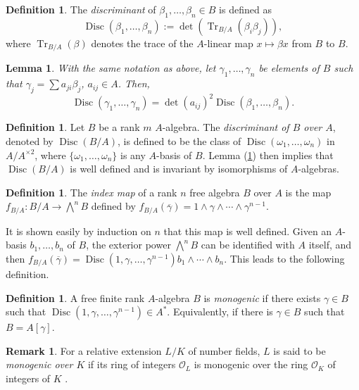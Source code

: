 \documentclass[oneside]{amsart}
\DeclareMathOperator{\disc}{Disc}
\DeclareMathOperator{\tr}{Tr}
\newtheorem{lemma}[X]{Lemma}
\theoremstyle{definition}
\newtheorem{definition}[X]{Definition}
\newtheorem{remark}[X]{Remark}
\begin{document}
\begin{definition}{\cite[pp. 31,32]{milneANT}} The \textit{discriminant} of  $\beta_1, \dots, \beta_n\in B$ is defined as
    $$
    \disc(\beta_1,\dots,\beta_n) := \det(\tr_{B/A}(\beta_i\beta_j)),
    $$
    where $\tr_{B/A}(\beta)$ denotes the trace of  the $A$-linear map 
    $x \mapsto \beta x$ from $B$ to $B$. 
\end{definition}
\begin{lemma}{\cite[Lem. 2.23]{milneANT}}
    \label{lemma: disc of elements}
    With the same notation as above, let $\gamma_1,\dots, \gamma_n$ be elements of $B$ such that $\gamma_j = \sum a_{ji}\beta_j$, $a_{ij} \in A$. Then, 
    $$
    \disc(\gamma_1,\dots,\gamma_n) = \det(a_{ij})^2\disc(\beta_1,\dots,\beta_n).
    $$
\end{lemma}
\begin{definition}{\cite[p. 33]{milneANT}}
    Let $B$ be a rank $m$ $A$-algebra. The \textit{discriminant of $B$ over $A$}, denoted by $\disc(B/A)$, is defined to be the class of $\disc(\omega_1,\dots,\omega_n)$ in $A/A^{\times 2}$, where $\{\omega_1,\dots,\omega_n\}$ is any $A$-basis of $B$. Lemma (\ref{lemma: disc of elements}) then implies that $\disc(B/A)$ is well defined and is invariant by isomorphisms of $A$-algebras.
\end{definition}

\begin{definition}
    The \textit{index map} of a rank $n$ free algebra $B$ over $A$ is the map $f_{B/A}:B/A \to \bigwedge^n B$ defined by $f_{B/A}(\overline{\gamma}) = 1\wedge \gamma \wedge \cdots \wedge \gamma^{n - 1}$.
\end{definition}
It is shown easily by induction on $n$ that this map is well defined. Given an $A$-basis $b_1,\dots, b_n$ of $B$, the exterior power $\bigwedge^n B$ can be identified with $A$ itself, and then $f_{B/A}(\overline{\gamma})=\operatorname{Disc}(1,\gamma,\dots,\gamma^{n-1}) b_1\wedge\cdots\wedge b_n$. This leads to the following definition.

\begin{definition}{\cite[Def. 1.2]{ArpinI}}
    A free finite rank $A$-algebra $B$ is \textit{monogenic} if there exists $\gamma\in B$ such that $\operatorname{Disc}(1,\gamma,\dots,\gamma^{n-1})\in A^\ast$. Equivalently, if there is $\gamma\in B$ such that $B=A[\gamma]$.
\end{definition}
 
\begin{remark} 
    For a relative extension  $L/K$ of number fields, $L$ is said to be \textit{monogenic over $K$} if its ring of integers $\mathcal{O}_L$ is monogenic over the ring $\mathcal{O}_K$ of integers of $K$ .
\end{remark}
\end{document}
